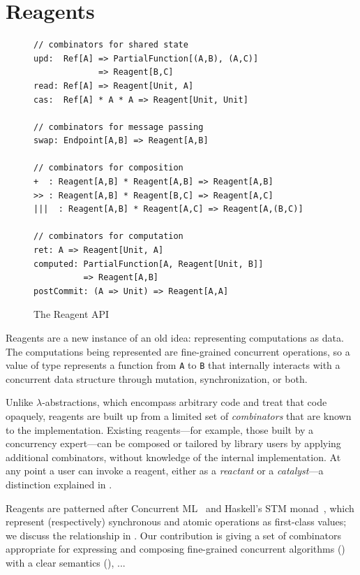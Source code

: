 \documentclass[preprint,nocopyrightspace]{sigplanconf}
\begin{document}

\section{Reagents}
\label{sec:reagents}

\begin{figure}
\begin{lstlisting}[mathescape=true,frame=single]
// combinators for shared state
upd:  Ref[A] => PartialFunction[(A,B), (A,C)] 
             => Reagent[B,C]
read: Ref[A] => Reagent[Unit, A]
cas:  Ref[A] * A * A => Reagent[Unit, Unit]

// combinators for message passing
swap: Endpoint[A,B] => Reagent[A,B]

// combinators for composition
+  : Reagent[A,B] * Reagent[A,B] => Reagent[A,B]
>> : Reagent[A,B] * Reagent[B,C] => Reagent[A,C]
|||  : Reagent[A,B] * Reagent[A,C] => Reagent[A,(B,C)]  

// combinators for computation
ret: A => Reagent[Unit, A]
computed: PartialFunction[A, Reagent[Unit, B]]
          => Reagent[A,B]
postCommit: (A => Unit) => Reagent[A,A]
\end{lstlisting}
\nocaptionrule
\caption{The Reagent API}
\label{fig:combinators}
\end{figure}

Reagents are a new instance of an old idea: representing computations as data.
The computations being represented are fine-grained concurrent operations, so
a value of type  represents a function from \lstinline{A} to
\lstinline{B} that internally interacts with a concurrent data structure
through mutation, synchronization, or both.

Unlike $\lambda$-abstractions, which encompass arbitrary code and treat that
code opaquely, reagents are built up from a limited set of \emph{combinators}
that are known to the implementation.  Existing reagents---for example, those
built by a concurrency expert---can be composed or tailored by library users
by applying additional combinators, without knowledge of the internal
implementation.  At any point a user can invoke a reagent, either as a
\emph{reactant} or a \emph{catalyst}---a distinction explained in
.

Reagents are patterned after Concurrent ML~\cite{?} and Haskell's STM
monad~\cite{?}, which represent (respectively) synchronous and atomic
operations as first-class values; we discuss the relationship in
.
%
Our contribution is giving a set of combinators appropriate for expressing and
composing fine-grained concurrent algorithms () with a
clear semantics (), ... %
\end{document}
